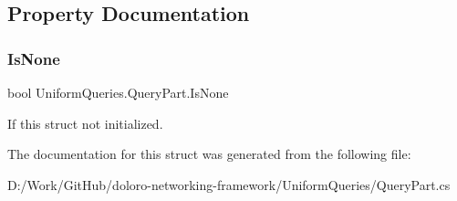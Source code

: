 \subsection{Property Documentation}
\mbox{\label{struct_uniform_queries_1_1_query_part_af380375ca82e9dc2eecf899b5933fe2b}} 
\subsubsection{\texorpdfstring{Is\+None}{IsNone}}
{\footnotesize\ttfamily bool Uniform\+Queries.\+Query\+Part.\+Is\+None\hspace{0.3cm}{\ttfamily [get]}}



If this struct not initialized. 



The documentation for this struct was generated from the following file\+:\begin{DoxyCompactItemize}
\item 
D\+:/\+Work/\+Git\+Hub/doloro-\/networking-\/framework/\+Uniform\+Queries/Query\+Part.\+cs\end{DoxyCompactItemize}
